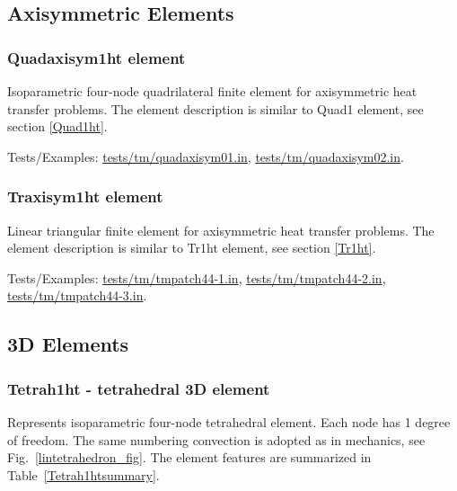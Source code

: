 \documentclass[a4paper]{article}
\begin{document}
\clearpage
\subsection{Axisymmetric Elements}
\subsubsection{Quadaxisym1ht element}
Isoparametric four-node quadrilateral finite element for
axisymmetric heat transfer problems. The element description is
similar to Quad1 element, see section \ref{Quad1ht}.

Tests/Examples: \href{https://github.com/oofem/oofem/blob/devel/tests/tm/quadaxisym01.in}{tests/tm/quadaxisym01.in}, \href{https://github.com/oofem/oofem/blob/devel/tests/tm/quadaxisym02.in}{tests/tm/quadaxisym02.in}.


\subsubsection{Traxisym1ht element}
Linear triangular finite element for axisymmetric heat transfer
problems. The element description is
similar to Tr1ht element, see section \ref{Tr1ht}.

Tests/Examples: \href{https://github.com/oofem/oofem/blob/devel/tests/tm/tmpatch44-1.in}{tests/tm/tmpatch44-1.in}, \href{https://github.com/oofem/oofem/blob/devel/tests/tm/tmpatch44-2.in}{tests/tm/tmpatch44-2.in}, \href{https://github.com/oofem/oofem/blob/devel/tests/tm/tmpatch44-3.in}{tests/tm/tmpatch44-3.in}.

\clearpage
\subsection{3D Elements}
\subsubsection{Tetrah1ht - tetrahedral 3D element}
Represents isoparametric four-node tetrahedral element. Each node has 1 degree of freedom.
The same numbering convection is adopted as in mechanics, see Fig.~\ref{lintetrahedron_fig}. The element features are summarized in Table~\ref{Tetrah1htsummary}.
\end{document}
